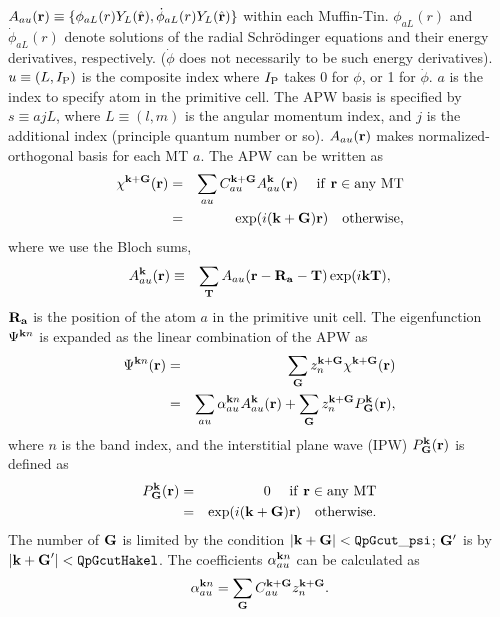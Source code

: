 \documentclass[a4paper,10pt,epsf,fleqn]{article}
\begin{document}
\noindent $A_{au}({\bf r})\equiv \{ \phi_{aL}(r) Y_L(\hat{\bf r}),\dot{\phi}_{aL}(r) Y_L(\hat{\bf r}) \}$
within each Muffin-Tin.
$\phi_{aL}(r)$ and $\dot{\phi}_{aL}(r)$ denote solutions of
the radial Schr\"odinger equations and their energy derivatives, respectively.
($\dot{\phi}$ does not necessarily to be such energy derivatives).
$u \equiv(L, I_{\rm P})$ is the composite index
where $I_{\rm P}$ takes 0 for $\phi$, or 1 for $\dot{\phi}$.
$a$ is the index to specify atom in the primitive cell.
The APW basis is specified by $s \equiv {ajL}$, where
$L\equiv(l,m)$ is the angular momentum index, and $j$ is the additional
index (principle quantum number or so). 
$A_{au}({\bf r})$ makes normalized-orthogonal basis for each MT $a$.
The APW can be written as
\begin{eqnarray}
\label{coeff}
\chi^{\bf k+G}({\bf r}) &=& \sum_{a u} C^{\bf k+G}_{a u} A^{\bf k}_{a u}({\bf r})   \ \ \ {\rm \ if \ {\bf r} \in any \ MT} \nonumber \\
        &=&   \exp(i ({\bf k+G}){\bf r}) \ \ \ {\rm otherwise},
\end{eqnarray}
where we use the Bloch sums,
\begin{eqnarray}
A^{\bf k}_{a u}({\bf r}) &\equiv& \sum_{\bf T} A_{a u}({\bf r-R_a-T}) \exp(i {\bf kT}),
\end{eqnarray}
${\bf R_a}$ is the position of the atom $a$ in the primitive unit cell.
The eigenfunction $\Psi^{{\bf k}n}$ is expanded as the linear combination of the APW as
\begin{eqnarray}
\label{eigenfunction}
\Psi^{{\bf k}n}({\bf r}) &=& \sum_{\bf G} z^{\bf k+G}_n \chi^{\bf k+G}({\bf r}) \\
&=& \sum_{a u} \alpha^{{\bf k}n}_{au} A^{\bf k}_{a u}({\bf r})
  + \sum_{\bf G} z^{\bf k+G}_n P^{\bf k}_{\bf G}({\bf r}),
\end{eqnarray}
where $n$ is the band index, 
and the interstitial plane wave (IPW) $P^{\bf k}_{\bf G}({\bf r})$ 
is defined as
\begin{eqnarray}
P^{\bf k}_{\bf G}({\bf r}) &=& 0  \ \ \ {\rm \ if \ {\bf r} \in any \ MT} \nonumber \\
        &=&   \exp (i ({\bf k+G}) {\bf r}) \ \ \ {\rm otherwise}.
\end{eqnarray}
The number of ${\bf G}$ is limited by the condition
$|{\bf k+G}|< {\tt QpGcut\_psi}$;
${\bf G}'$ is by $|{\bf k+G}'|< {\tt  QpGcutHakel}$.
The coefficients $\alpha^{{\bf k}n}_{au}$ can be calculated as
\begin{eqnarray}
\alpha^{{\bf k}n}_{au} = \sum_{\bf G} C^{{\bf k+G}}_{a u} z^{\bf k+G}_n.
\end{eqnarray}
\end{document}
